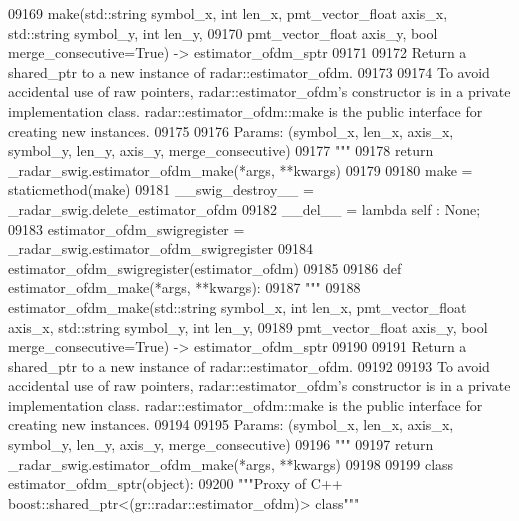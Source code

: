 \begin{DoxyCode}
{{{{{{{{{{{{{{{{{{{{{{{{{{{{{{09169 \textcolor{stringliteral}{        make(std::string symbol\_x, int len\_x, pmt\_vector\_float axis\_x, std::string symbol\_y, int len\_y, }
09170 \textcolor{stringliteral}{            pmt\_vector\_float axis\_y, bool merge\_consecutive=True) -> estimator\_ofdm\_sptr}
09171 \textcolor{stringliteral}{}
09172 \textcolor{stringliteral}{        Return a shared\_ptr to a new instance of radar::estimator\_ofdm.}
09173 \textcolor{stringliteral}{}
09174 \textcolor{stringliteral}{        To avoid accidental use of raw pointers, radar::estimator\_ofdm's constructor is in a private
       implementation class. radar::estimator\_ofdm::make is the public interface for creating new instances.}
09175 \textcolor{stringliteral}{}
09176 \textcolor{stringliteral}{        Params: (symbol\_x, len\_x, axis\_x, symbol\_y, len\_y, axis\_y, merge\_consecutive)}
09177 \textcolor{stringliteral}{        """}
09178         \textcolor{keywordflow}{return} \_radar\_swig.estimator\_ofdm\_make(*args, **kwargs)
09179 
09180     make = staticmethod(make)
09181     \_\_swig\_destroy\_\_ = \_radar\_swig.delete\_estimator\_ofdm
09182     \_\_del\_\_ = \textcolor{keyword}{lambda} self : \textcolor{keywordtype}{None};
09183 estimator\_ofdm\_swigregister = \_radar\_swig.estimator\_ofdm\_swigregister
09184 estimator_ofdm_swigregister(estimator\_ofdm)
09185 
09186 \textcolor{keyword}{def }estimator_ofdm_make(*args, **kwargs):
09187   \textcolor{stringliteral}{"""}
09188 \textcolor{stringliteral}{    estimator\_ofdm\_make(std::string symbol\_x, int len\_x, pmt\_vector\_float axis\_x, std::string symbol\_y, int
       len\_y, }
09189 \textcolor{stringliteral}{        pmt\_vector\_float axis\_y, bool merge\_consecutive=True) -> estimator\_ofdm\_sptr}
09190 \textcolor{stringliteral}{}
09191 \textcolor{stringliteral}{    Return a shared\_ptr to a new instance of radar::estimator\_ofdm.}
09192 \textcolor{stringliteral}{}
09193 \textcolor{stringliteral}{    To avoid accidental use of raw pointers, radar::estimator\_ofdm's constructor is in a private
       implementation class. radar::estimator\_ofdm::make is the public interface for creating new instances.}
09194 \textcolor{stringliteral}{}
09195 \textcolor{stringliteral}{    Params: (symbol\_x, len\_x, axis\_x, symbol\_y, len\_y, axis\_y, merge\_consecutive)}
09196 \textcolor{stringliteral}{    """}
09197   \textcolor{keywordflow}{return} \_radar\_swig.estimator\_ofdm\_make(*args, **kwargs)
09198 
09199 \textcolor{keyword}{class }estimator_ofdm_sptr(object):
09200     \textcolor{stringliteral}{"""Proxy of C++ boost::shared\_ptr<(gr::radar::estimator\_ofdm)> class"""}
}}}}}}}}}}}}}}}}}}}}}}}}}}}}}}
\end{DoxyCode}
